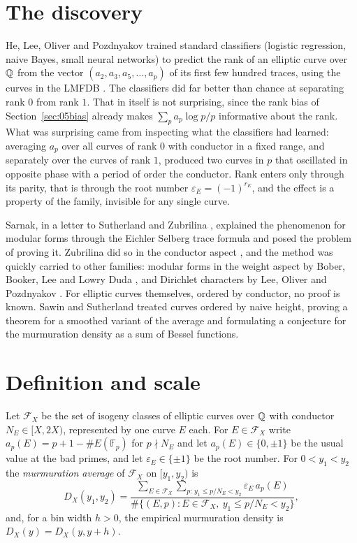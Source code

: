 \section{The discovery}\label{sec:05bdisc}

He, Lee, Oliver and Pozdnyakov trained standard classifiers (logistic regression, naive Bayes, small neural networks) to predict the rank of an elliptic curve over $\mathbb{Q}$ from the vector $(a_2,a_3,a_5,\dots,a_p)$ of its first few hundred traces, using the curves in the LMFDB \cite{lmfdb}. The classifiers did far better than chance at separating rank $0$ from rank $1$. That in itself is not surprising, since the rank bias of Section~\ref{sec:05bias} already makes $\sum_p a_p\log p/p$ informative about the rank. What was surprising came from inspecting what the classifiers had learned: averaging $a_p$ over all curves of rank $0$ with conductor in a fixed range, and separately over the curves of rank $1$, produced two curves in $p$ that oscillated in opposite phase with a period of order the conductor. Rank enters only through its parity, that is through the root number $\varepsilon_E=(-1)^{r_E}$, and the effect is a property of the family, invisible for any single curve.

Sarnak, in a letter to Sutherland and Zubrilina \cite{sarnakletter2023}, explained the phenomenon for modular forms through the Eichler Selberg trace formula and posed the problem of proving it. Zubrilina did so in the conductor aspect \cite{zubrilina2023}, and the method was quickly carried to other families: modular forms in the weight aspect by Bober, Booker, Lee and Lowry Duda \cite{bbllp2023}, and Dirichlet characters by Lee, Oliver and Pozdnyakov \cite{lop2023}. For elliptic curves themselves, ordered by conductor, no proof is known. Sawin and Sutherland \cite{sawinsutherland2025} treated curves ordered by naive height, proving a theorem for a smoothed variant of the average and formulating a conjecture for the murmuration density as a sum of Bessel functions.

\section{Definition and scale}\label{sec:05bdef}

\begin{definition}\label{def:05bmurm}
Let $\mathcal{F}_X$ be the set of isogeny classes of elliptic curves over $\mathbb{Q}$ with conductor $N_E\in[X,2X)$, represented by one curve $E$ each. For $E\in\mathcal{F}_X$ write $a_p(E)=p+1-\#E(\mathbb{F}_p)$ for $p\nmid N_E$ and let $a_p(E)\in\{0,\pm1\}$ be the usual value at the bad primes, and let $\varepsilon_E\in\{\pm1\}$ be the root number. For $0<y_1<y_2$ the \emph{murmuration average} of $\mathcal{F}_X$ on $[y_1,y_2)$ is
\[
D_X(y_1,y_2)=\frac{\sum_{E\in\mathcal{F}_X}\sum_{p:\,y_1\le p/N_E<y_2}\varepsilon_E\,a_p(E)}{\#\{(E,p):E\in\mathcal{F}_X,\ y_1\le p/N_E<y_2\}},
\]
and, for a bin width $h>0$, the empirical murmuration density is $D_X(y)=D_X(y,y+h)$.
\end{definition}

